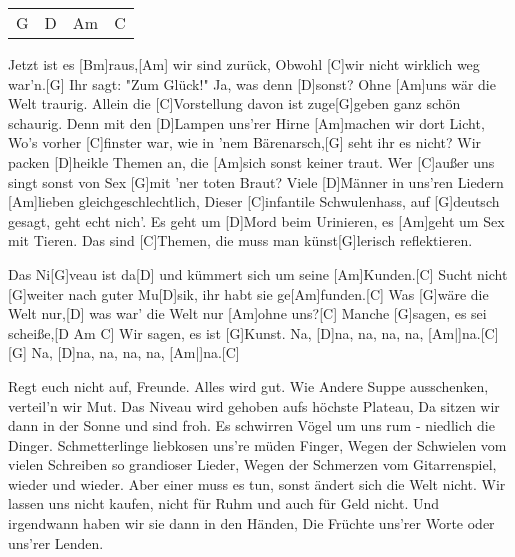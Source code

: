 

\begin{guitar}
	{\footnotesize\begin{tabular}{l|l|l|l}
		G	& D	& Am	& C
	\end{tabular}}
	
	Jetzt ist es [Bm]raus,[Am] wir sind zurück,
	Obwohl [C]wir nicht wirklich weg war'n.[G] Ihr sagt: "Zum Glück!"
	Ja, was denn [D]sonst? Ohne [Am]uns wär die Welt traurig.
	Allein die [C]Vorstellung davon ist zuge[G]geben ganz schön schaurig.
	Denn mit den [D]Lampen uns'rer Hirne [Am]machen wir dort Licht,
	Wo's vorher [C]finster war, wie in 'nem Bärenarsch,[G] seht ihr es nicht?
	Wir packen [D]heikle Themen an, die [Am]sich sonst keiner traut.
	Wer [C]außer uns singt sonst von Sex [G]mit 'ner toten Braut?
	Viele [D]Männer in uns'ren Liedern [Am]lieben gleichgeschlechtlich,
	Dieser [C]infantile Schwulenhass, auf [G]deutsch gesagt, geht echt nich'.
	Es geht um [D]Mord beim Urinieren, es [Am]geht um Sex mit Tieren.
	Das sind [C]Themen, die muss man künst[G]lerisch reflektieren.
	
	Das Ni[G]veau ist da[D] und kümmert sich um seine [Am]Kunden.[C]{}
	Sucht nicht [G]weiter nach guter Mu[D]sik, ihr habt sie ge[Am]funden.[C]{}
	Was [G]wäre die Welt nur,[D] was war' die Welt nur [Am]ohne uns?[C]{}
	Manche [G]sagen, es sei scheiße,[D Am C]{}
	Wir sagen, es ist [G]Kunst. Na, [D]na, na, na, na, [Am|]{na.}[C]{}
	[G] Na, [D]na, na, na, na, [Am|]{na.}[C]{}
	
	\pagebreak
	
	Regt euch nicht auf, Freunde. Alles wird gut.
	Wie Andere Suppe ausschenken, verteil'n wir Mut.
	Das Niveau wird gehoben aufs höchste Plateau,
	Da sitzen wir dann in der Sonne und sind froh.
	Es schwirren Vögel um uns rum - niedlich die Dinger.
	Schmetterlinge liebkosen uns're müden Finger,
	Wegen der Schwielen vom vielen Schreiben so grandioser Lieder,
	Wegen der Schmerzen vom Gitarrenspiel, wieder und wieder.
	Aber einer muss es tun, sonst ändert sich die Welt nicht.
	Wir lassen uns nicht kaufen, nicht für Ruhm und auch für Geld nicht.
	Und irgendwann haben wir sie dann in den Händen,
	Die Früchte uns'rer Worte oder uns'rer Lenden.
	
	 
\end{guitar}